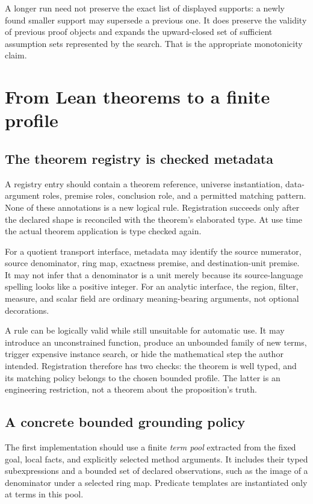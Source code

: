\documentclass[11pt,a4paper]{article}
\theoremstyle{definition}
\theoremstyle{remark}
\begin{document}
A longer run need not preserve the exact list of displayed supports: a newly found smaller support may supersede a previous one. It does preserve the validity of previous proof objects and expands the upward-closed set of sufficient assumption sets represented by the search. That is the appropriate monotonicity claim.

\section{From Lean theorems to a finite profile}\label{sec:grounding}
\subsection{The theorem registry is checked metadata}
A registry entry should contain a theorem reference, universe instantiation, data-argument roles, premise roles, conclusion role, and a permitted matching pattern. None of these annotations is a new logical rule. Registration succeeds only after the declared shape is reconciled with the theorem's elaborated type. At use time the actual theorem application is type checked again.

For a quotient transport interface, metadata may identify the source numerator, source denominator, ring map, exactness premise, and destination-unit premise. It may not infer that a denominator is a unit merely because its source-language spelling looks like a positive integer. For an analytic interface, the region, filter, measure, and scalar field are ordinary meaning-bearing arguments, not optional decorations.

A rule can be logically valid while still unsuitable for automatic use. It may introduce an unconstrained function, produce an unbounded family of new terms, trigger expensive instance search, or hide the mathematical step the author intended. Registration therefore has two checks: the theorem is well typed, and its matching policy belongs to the chosen bounded profile. The latter is an engineering restriction, not a theorem about the proposition's truth.

\subsection{A concrete bounded grounding policy}
The first implementation should use a finite \emph{term pool} extracted from the fixed goal, local facts, and explicitly selected method arguments. It includes their typed subexpressions and a bounded set of declared observations, such as the image of a denominator under a selected ring map. Predicate templates are instantiated only at terms in this pool.
\end{document}
